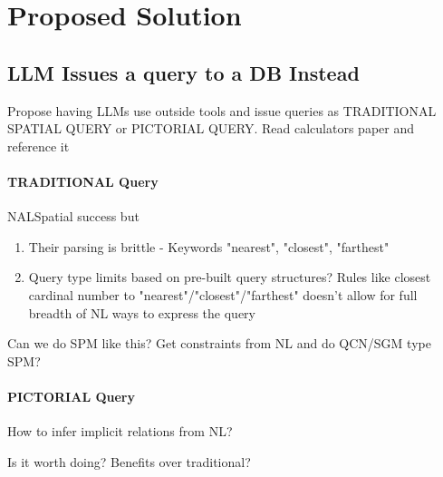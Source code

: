 \section{Proposed Solution}
\label{section:proposal}

\subsection{LLM Issues a query to a DB Instead}
Propose having LLMs use outside tools and issue queries as TRADITIONAL SPATIAL QUERY or PICTORIAL QUERY.
    Read calculators paper and reference it

    \paragraph{TRADITIONAL Query}
        NALSpatial success but 
        \begin{enumerate}
            \item Their parsing is brittle - Keywords "nearest", "closest", "farthest"
            \item Query type limits based on pre-built query structures? 
                    Rules like closest cardinal number to "nearest"/"closest"/"farthest" doesn't allow for full breadth of NL ways to express the query
        \end{enumerate}
    
        Can we do SPM like this? Get constraints from NL and do QCN/SGM type SPM?
        

    \paragraph{PICTORIAL Query}
        How to infer implicit relations from NL?

        Is it worth doing? Benefits over traditional?